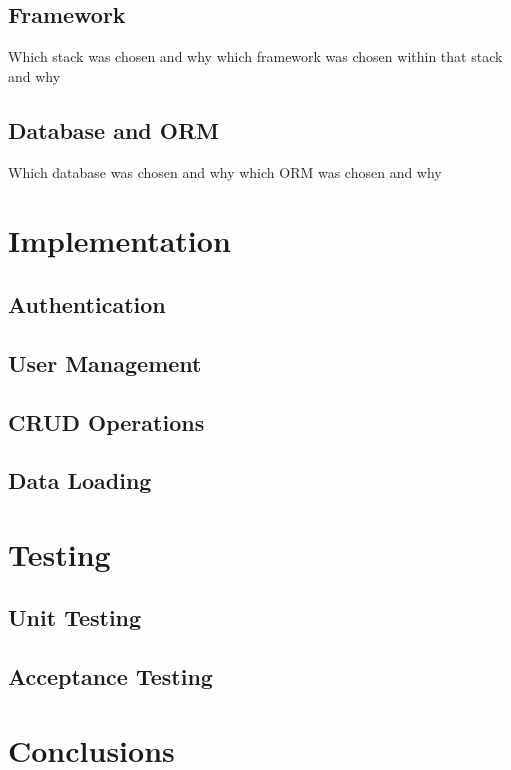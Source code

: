 \documentclass[12pt, a4paper,twoside]{report}
\theoremstyle{plain} %
\theoremstyle{definition} %
\numberwithin{equation}{chapter}
\begin{document}
\section{Framework}\label{sec:framework}

Which stack was chosen and why
which framework was chosen within that stack and why

\section{Database and ORM}\label{sec:databaseorm}

Which database was chosen and why
which ORM was chosen and why


\chapter{Implementation}\label{ch:implementation}

\section{Authentication}\label{sec:authentication}

\section{User Management}\label{sec:usermanagement}

\section{CRUD Operations}\label{sec:crudoperations}

\section{Data Loading}\label{sec:dataloading}


\chapter{Testing}\label{ch:testing}

\section{Unit Testing}\label{sec:unittesting}

\section{Acceptance Testing}\label{sec:acceptancetesting}


\chapter{Conclusions}\label{ch:conclusion}



\end{document}
